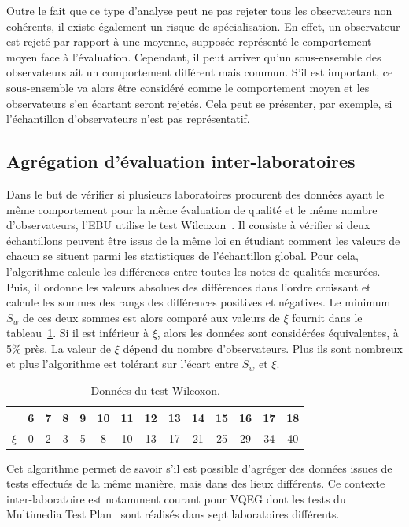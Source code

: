 Outre le fait que ce type d'analyse peut ne pas rejeter tous les observateurs non cohérents, il existe également un risque de spécialisation. En effet, un observateur est rejeté par rapport à une moyenne, supposée représenté le comportement moyen face à l'évaluation. Cependant, il peut arriver qu'un sous-ensemble des observateurs ait un comportement différent mais commun. S'il est important, ce sous-ensemble va alors être considéré comme le comportement moyen et les observateurs s'en écartant seront rejetés. Cela peut se présenter, par exemple, si l'échantillon d'observateurs n'est pas représentatif.


\subsection{Agrégation d'évaluation inter-laboratoires}
Dans le but de vérifier si plusieurs laboratoires procurent des données ayant le même comportement pour la même évaluation de qualité et le même nombre d'observateurs, l'EBU utilise le test Wilcoxon~\cite{wilcoxon-bb}. Il consiste à vérifier si deux échantillons peuvent être issus de la même loi en étudiant comment les valeurs de chacun se situent parmi les statistiques de l'échantillon global. Pour cela, l'algorithme calcule les différences entre toutes les notes de qualités mesurées. Puis, il ordonne les valeurs absolues des différences dans l'ordre croissant et calcule les sommes des rangs des différences positives et négatives. Le minimum $S_w$ de ces deux sommes est alors comparé aux valeurs de $\xi$ fournit dans le tableau~\ref{tab:wilcoxon}. Si il est inférieur à $\xi$, alors les données sont considérées équivalentes, à 5\% près. La valeur de $\xi$ dépend du nombre d'observateurs. Plus ils sont nombreux et plus l'algorithme est tolérant sur l'écart entre $S_w$ et $\xi$.

\begin{table}[htbp]
	\centering
	\begin{tabular}[c]{cccccccccccccc}\toprule
		\strong{nombre d'observateurs} & 6 & 7 & 8 & 9 & 10 & 11 & 12 & 13 & 14 & 15 & 16 & 17 & 18 \\ \midrule
		$\xi$ & 0 & 2 & 3 & 5 & 8 & 10 & 13 & 17 & 21 & 25 & 29 & 34 & 40 \\ \bottomrule
	\end{tabular}
	\caption{Données du test Wilcoxon.}
	\label{tab:wilcoxon}
\end{table}

Cet algorithme permet de savoir s'il est possible d'agréger des données issues de tests effectués de la même manière, mais dans des lieux différents. Ce contexte inter-laboratoire est notamment courant pour VQEG dont les tests du Multimedia Test Plan~\cite{vqeg-MMtestplan} sont réalisés dans sept laboratoires différents.


